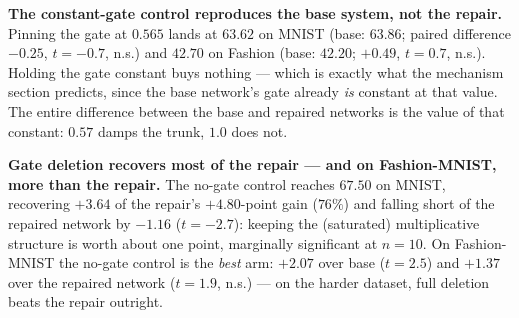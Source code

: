 \documentclass[10pt]{article}
\begin{document}
\begin{table}[t]
\centering
\caption{Four-arm control experiment ($n=10$ paired seeds, $\rho=0$, matched width $n_h=256$, matched usage-weighted anchors). Differences are paired against the base arm of the same dataset and seed; $p$ is Holm-corrected within each metric family; $d_z$ is the paired standardized effect size.}
\label{tab:ablation}
\end{table}


\textbf{The constant-gate control reproduces the base system, not the
repair.} Pinning the gate at $0.565$ lands at $63.62$ on MNIST (base:
$63.86$; paired difference $-0.25$, $t{=}-0.7$, n.s.) and $42.70$ on
Fashion (base: $42.20$; $+0.49$, $t{=}0.7$, n.s.). Holding the gate
constant buys nothing --- which is exactly what the mechanism section
predicts, since the base network's gate already \emph{is} constant at
that value. The entire difference between the base and repaired
networks is the value of that constant: $0.57$ damps the trunk,
$1.0$ does not.

\textbf{Gate deletion recovers most of the repair --- and on
Fashion-MNIST, more than the repair.} The no-gate control reaches
$67.50$ on MNIST, recovering $+3.64$ of the repair's $+4.80$-point gain
($76\%$) and falling short of the repaired network by $-1.16$
($t{=}-2.7$): keeping the (saturated) multiplicative structure is worth
about one point, marginally significant at $n{=}10$. On Fashion-MNIST
the no-gate control is the \emph{best} arm: $+2.07$ over base
($t{=}2.5$) and $+1.37$ over the repaired network ($t{=}1.9$, n.s.) ---
on the harder dataset, full deletion beats the repair outright.
\end{document}
